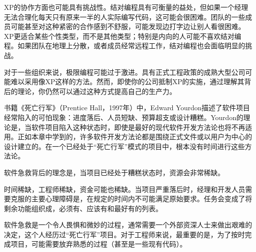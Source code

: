 XP的协作方面也可能具有挑战性。结对编程具有可衡量的益处，但如果一个经理无法合理化每天只有原来一半的人实际编写代码，这可能会很困难。团队的一些成员可能甚至对这种紧密的合作感到不舒服，可能发现边打字边让别人看很困难。XP更适合某些个性类型，而不是其他类型；特别是内向的人可能不喜欢结对编程。如果团队在地理上分散，或者成员经常远程工作，结对编程也会面临明显的挑战。

对于一些组织来说，极限编程可能过于激进。具有正式工程政策的成熟大型公司可能难以采用像XP这样的方法。然而，即使你的公司抵制XP的实施，通过理解其背后的理论，你仍然可以通过这种方式提高自己的生产力。


书籍《死亡行军》（Prentice Hall，1997年）中，Edward Yourdon描述了软件项目经常陷入的可怕现象：进度落后、人员短缺、预算超支或设计糟糕。Yourdon的理论是，当软件项目陷入这种状态时，即使是最好的现代软件开发方法论也将不再适用。正如本章中学到的，许多软件开发方法论都是围绕正式文件或以用户为中心的设计建立的。在一个已经处于“死亡行军”模式的项目中，根本没有时间进行这些方法论。

软件急救背后的理念是，当项目已经处于糟糕状态时，资源会非常稀缺。

时间稀缺，工程师稀缺，资金可能也稀缺。当项目严重落后时，经理和开发人员需要克服的主要心理障碍是，在规定的时间内不可能满足原始要求。任务会变成了将剩余功能组织成，必须有、应该有和最好有的列表。

软件急救是一个令人畏惧和微妙的过程，通常需要一个外部资深人士来做出艰难的决定，这个人经历过“死亡行军”项目。对于工程师来说，最重要的是，为了按时完成项目，可能需要放弃熟悉的过程（甚至是一些现有代码）。


